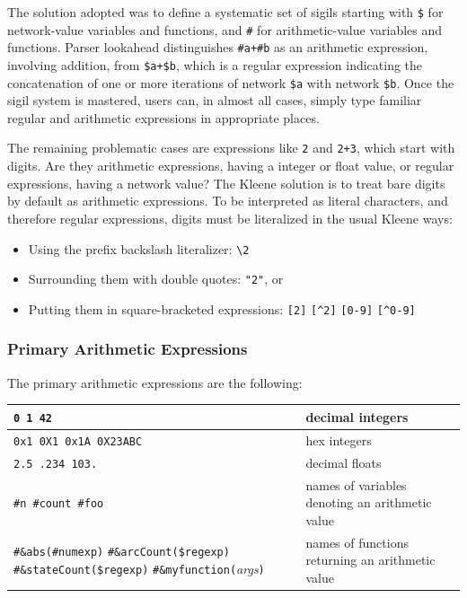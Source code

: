 \documentclass[letterpaper,12pt]{article}
\newcommand{\Kleene}{Kleene\xspace}
\begin{document}
The solution adopted was to define a systematic set of sigils starting
with \verb!$! for network-value variables and functions, and \verb!#! for
arithmetic-value variables and functions.  Parser lookahead distinguishes
\verb!#a+#b! as an arithmetic expression, involving addition, from
\verb!$a+$b!, which is a regular expression indicating the concatenation
of one or more iterations of network \verb!$a! with network \verb!$b!.
Once the sigil system is mastered, users can, in almost all cases, simply
type familiar regular and arithmetic expressions in appropriate places. 

The remaining problematic cases are expressions like \verb!2! and
\verb!2+3!, which start with digits.  Are they arithmetic expressions,
having a integer or float value, or regular expressions, having a network
value?  The \Kleene{} solution is to treat bare digits by default as
arithmetic expressions.  To be interpreted as literal characters, and
therefore regular expressions, digits must be literalized in the usual
\Kleene{} ways:

\begin{itemize}
\item
Using the prefix backslash literalizer:  \verb!\2!
\item
Surrounding them with double quotes: \verb!"2"!, or
\item
Putting them in square-bracketed expressions: \verb![2]! \verb![^2]! \verb![0-9]! \verb![^0-9]!
\end{itemize}

\subsubsection{Primary Arithmetic Expressions}

The primary arithmetic expressions are the following:

\vspace{.5cm}

\renewcommand\tabcolsep{1.25mm}

\noindent
\begin{tabular}{|p{5.5cm}|l|}
\hline
\verb!0 1 42!  & decimal integers\\
\hline
\verb!0x1 0X1 0x1A 0X23ABC! & hex integers\\
\hline
\verb!2.5 .234 103.! & decimal floats\\
\hline
\verb!#n #count #foo! & names of variables denoting an arithmetic value\\
\hline
\verb!#&abs(#numexp)! \verb!#&arcCount($regexp)!
\verb!#&stateCount($regexp)! \verb!#&myfunction(!\emph{args}\verb!)! & names of functions returning an arithmetic value\\
\hline
\end{tabular}
\end{document}
